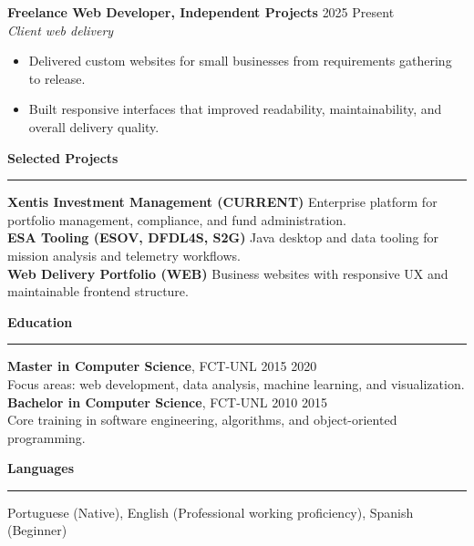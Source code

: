\documentclass[9pt,a4paper]{extarticle}
\newcommand{\sectiontitle}[1]{%
  \vspace{3pt}
  {\small\bfseries\color{heading}#1}\par
  \rule{\linewidth}{0.35pt}\vspace{1pt}
}
\newcommand{\roleheader}[3]{%
  {\bfseries #1} \hfill {\color{textsoft}#2}\\[-1pt]
  {\itshape #3\/}\\[-2pt]
}
\begin{document}
\roleheader{Freelance Web Developer, Independent Projects}{2025 \textendash{} Present}{Client web delivery}
\begin{itemize}
  \item Delivered custom websites for small businesses from requirements gathering to release.
  \item Built responsive interfaces that improved readability, maintainability, and overall delivery quality.
\end{itemize}

\sectiontitle{Selected Projects}
\textbf{Xentis Investment Management (CURRENT)} \textendash{} Enterprise platform for portfolio management, compliance, and fund administration.\\
\textbf{ESA Tooling (ESOV, DFDL4S, S2G)} \textendash{} Java desktop and data tooling for mission analysis and telemetry workflows.\\
\textbf{Web Delivery Portfolio (WEB)} \textendash{} Business websites with responsive UX and maintainable frontend structure.

\sectiontitle{Education}
\textbf{Master in Computer Science}, FCT-UNL \hfill 2015 \textendash{} 2020\\
Focus areas: web development, data analysis, machine learning, and visualization.\\[-1pt]
\textbf{Bachelor in Computer Science}, FCT-UNL \hfill 2010 \textendash{} 2015\\
Core training in software engineering, algorithms, and object-oriented programming.

\sectiontitle{Languages}
Portuguese (Native), English (Professional working proficiency), Spanish (Beginner)
\end{document}
